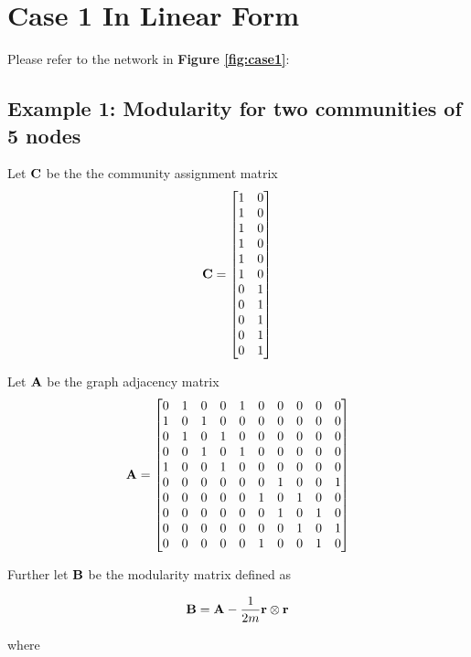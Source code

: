 \documentclass[a4paper,12pt]{article}
\begin{document}
	
	
	\newpage
	\appendix
	
	\section*{Case 1 In Linear Form}
	Please refer to the network in \textbf{Figure \ref{fig:case1}}:
	
	\subsection*{Example 1: Modularity for two communities of 5 nodes}
	Let $\bf{C}$ be the the community assignment matrix 
	\[ {\bf C} = \begin{bmatrix}1 & 0 \\ 1 & 0 \\ 1 & 0 \\ 1 & 0 \\ 1 & 0 \\ 1 & 0 \\ 0 & 1 \\ 0 & 1 \\ 0 & 1 \\ 0 & 1 \\ 0 & 1 \\
	\end{bmatrix}\] 
	
	Let $\bf A$ be the graph adjacency matrix
	\[ {\bf A} = \begin{bmatrix}
		0& 1& 0& 0& 1& 0& 0& 0& 0& 0\\
		1& 0& 1& 0& 0& 0& 0& 0& 0& 0\\
		0& 1& 0& 1& 0& 0& 0& 0& 0& 0\\
		0& 0& 1& 0& 1& 0& 0& 0& 0& 0\\
		1& 0& 0& 1& 0& 0& 0& 0& 0& 0\\
		0& 0& 0& 0& 0& 0& 1& 0& 0& 1\\
		0& 0& 0& 0& 0& 1& 0& 1& 0& 0\\
		0& 0& 0& 0& 0& 0& 1& 0& 1& 0\\
		0& 0& 0& 0& 0& 0& 0& 1& 0& 1\\
		0& 0& 0& 0& 0& 1& 0& 0& 1& 0
	\end{bmatrix}\] 
	
	Further let $\bf B$ be the modularity matrix defined as 
	
	\[ {\bf B} = {\bf A} - \frac{1}{2m}{\bf r}\otimes {\bf r} \]
	
	where 
	
\end{document}
